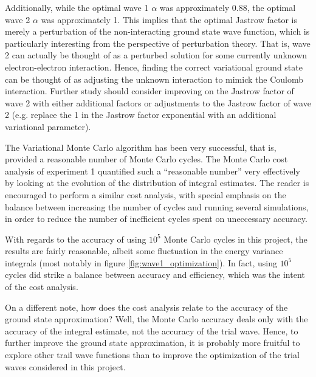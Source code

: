 \documentclass[nofootinbib,reprint,english]{revtex4-1}
\begin{document}
Additionally, while the optimal wave 1 \(\alpha\) was approximately 0.88, the optimal wave 2 \(\alpha\) was approximately 1. This implies that the optimal Jastrow factor is merely a perturbation of the non-interacting ground state wave function, which is particularly interesting from the perspective of perturbation theory. That is, wave 2 can actually be thought of as a perturbed solution for some currently unknown electron-electron interaction. Hence, finding the correct variational ground state can be thought of as adjusting the unknown interaction to mimick the Coulomb interaction. Further study should consider improving on the Jastrow factor of wave 2 with either additional factors or adjustments to the Jastrow factor of wave 2 (e.g. replace the 1 in the Jastrow factor exponential with an additional variational parameter).

The Variational Monte Carlo algorithm has been very successful, that is, provided a reasonable number of Monte Carlo cycles. The Monte Carlo cost analysis of experiment 1 quantified such a ``reasonable number'' very effectively by looking at the evolution of the distribution of integral estimates. The reader is encouraged to perform a similar cost analysis, with special emphasis on the balance between increasing the number of cycles and running several simulations, in order to reduce the number of inefficient cycles spent on uneccessary accuracy.

With regards to the accuracy of using \(10^5\) Monte Carlo cycles in this project, the results are fairly reasonable, albeit some fluctuation in the energy variance integrals (most notably in figure \ref{fig:wave1_optimization}). In fact, using \(10^5\) cycles did strike a balance between accuracy and efficiency, which was the intent of the cost analysis.

On a different note, how does the cost analysis relate to the accuracy of the ground state approximation? Well, the Monte Carlo accuracy deals only with the accuracy of the integral estimate, not the accuracy of the trial wave. Hence, to further improve the ground state approximation, it is probably more fruitful to explore other trail wave functions than to improve the optimization of the trial waves considered in this project.
\end{document}
